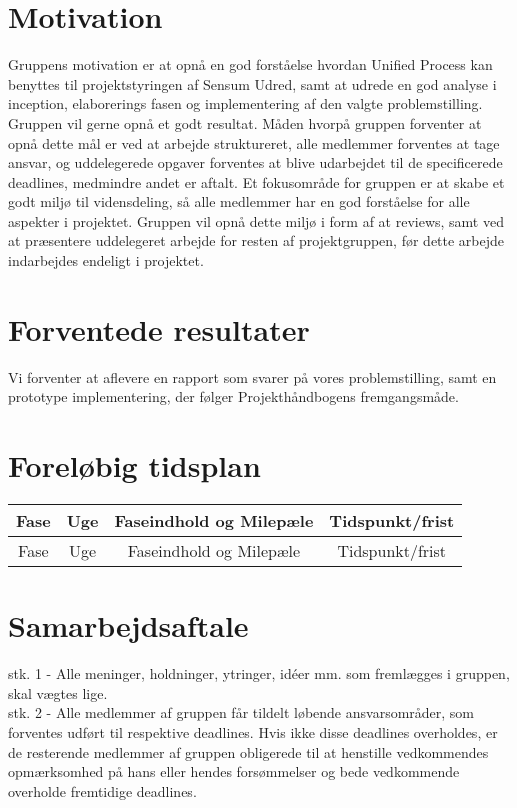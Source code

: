 \documentclass[../../main.tex]{subfiles}
\begin{document}
\section{Motivation}
Gruppens motivation er at opnå en god forståelse hvordan Unified Process kan
benyttes til projektstyringen af Sensum Udred, samt at udrede en god analyse
i inception, elaborerings fasen og implementering af den valgte problemstilling.
Gruppen vil gerne opnå et godt resultat.
Måden hvorpå gruppen forventer at opnå dette mål er ved at arbejde struktureret,
alle medlemmer forventes at tage ansvar, og uddelegerede opgaver forventes at
blive udarbejdet til de specificerede deadlines, medmindre andet er aftalt.
Et fokusområde for gruppen er at skabe et godt miljø til vidensdeling, så alle
medlemmer har en god forståelse for alle aspekter i projektet.
Gruppen vil opnå dette miljø i form af at reviews, samt ved at præsentere
uddelegeret arbejde for resten af projektgruppen, før dette arbejde indarbejdes
endeligt i projektet.

\section{Forventede resultater}
Vi forventer at aflevere en rapport som svarer på vores problemstilling, samt en
prototype implementering, der følger Projekthåndbogens fremgangsmåde.

\section{Foreløbig tidsplan}
\begin{center}
  \begin{tabular}{ c | c c c }
    Fase & Uge & Faseindhold og Milepæle & Tidspunkt/frist \\
    \hline
    Fase & Uge & Faseindhold og Milepæle & Tidspunkt/frist \\
    \hline
  \end{tabular}
\end{center}

\section{Samarbejdsaftale}
stk. 1 - Alle meninger, holdninger, ytringer, idéer mm. som fremlægges i gruppen, skal vægtes lige.\\

stk. 2 - Alle medlemmer af gruppen får tildelt løbende ansvarsområder, som forventes udført til respektive deadlines. Hvis ikke disse deadlines overholdes, er de resterende medlemmer af gruppen obligerede til at henstille vedkommendes opmærksomhed på hans eller hendes forsømmelser og bede vedkommende overholde fremtidige deadlines.\\
\end{document}
